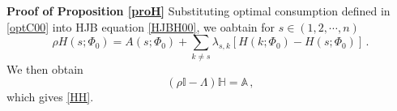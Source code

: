 \documentclass[12pt]{article}
\begin{document}
\bigskip
\noindent\textbf{Proof of Proposition \ref{proH}} \quad
Substituting optimal consumption defined in \eqref{optC00} into HJB equation \eqref{HJBH00}, we oabtain for $s\in (1, 2, \cdots, n)$
\begin{equation}
\rho H(s; \Phi_0) = A(s; \Phi_0) + \sum_{k\neq s} \lambda_{s, k}\left[H(k; \Phi_0) - H(s; \Phi_0) \right] \,.
\end{equation}
We then obtain
\begin{equation}
\left ( \rho \mathbb{I} -{\Lambda} \right) \mathbb{H} =\mathbb{A} \,,
\end{equation}
which gives \eqref{HH}. 



\end{document}
